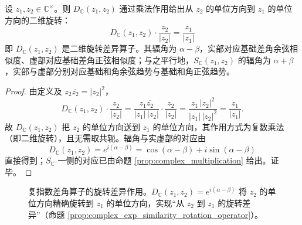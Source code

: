 \begin{proposition}[复指数差角算子是二维旋转差异算子]\label{prop:complex_exp_similarity_rotation_operator}
设 $z_1,z_2\in\mathbb C^\times$。则 $D_{\mathbb C}(z_1,z_2)$ 通过乘法作用给出从 $z_2$ 的单位方向到 $z_1$ 的单位方向的二维旋转：
\[
\boxed{
D_{\mathbb C}(z_1,z_2)\cdot \frac{z_2}{|z_2|}
=
\frac{z_1}{|z_1|}
}
\]
即 $D_{\mathbb C}(z_1,z_2)$ 是二维旋转差异算子。其辐角为 $\alpha-\beta$，实部对应基础差角余弦相似度、虚部对应基础差角正弦相似度；与之平行地，$S_{\mathbb C}(z_1,z_2)$ 的辐角为 $\alpha+\beta$，实部与虚部分别对应基础和角余弦趋势与基础和角正弦趋势。
\end{proposition}

\begin{proof}
由定义及 $z_2\overline{z_2}=|z_2|^2$，
\[
D_{\mathbb C}(z_1,z_2)\cdot\frac{z_2}{|z_2|}
=
\frac{z_1\overline{z_2}}{|z_1|\,|z_2|}\cdot\frac{z_2}{|z_2|}
=
\frac{z_1\,|z_2|^2}{|z_1|\,|z_2|^2}
=
\frac{z_1}{|z_1|}.
\]
故 $D_{\mathbb C}(z_1,z_2)$ 把 $z_2$ 的单位方向送到 $z_1$ 的单位方向，其作用方式为复数乘法（即二维旋转），且无需取共轭。辐角与实虚部的对应由
\[
D_{\mathbb C}(z_1,z_2)=e^{i(\alpha-\beta)}=\cos(\alpha-\beta)+i\sin(\alpha-\beta)
\]
直接得到；$S_{\mathbb C}$ 一侧的对应已由命题 \ref{prop:complex_multiplication} 给出。证毕。
\end{proof}

\begin{figure}[htbp]
    \centering
    \caption{复指数差角算子的旋转差异作用。$D_{\mathbb{C}}(z_1,z_2)=e^{i(\alpha-\beta)}$ 将 $z_2$ 的单位方向精确旋转到 $z_1$ 的单位方向，实现“从 $z_2$ 到 $z_1$ 的旋转差异”（命题 \ref{prop:complex_exp_similarity_rotation_operator}）。}
    \label{fig:complex_exp_rotation_operator}
\end{figure}


